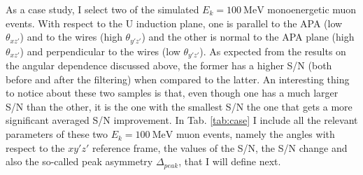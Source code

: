 As a case study, I select two of the simulated $E_{k} = 100 \ \mathrm{MeV}$ monoenergetic muon events. With respect to the U induction plane, one is parallel to the APA (low $\theta_{xz'}$) and to the wires (high $\theta_{y'z'}$) and the other is normal to the APA plane (high $\theta_{xz'}$) and perpendicular to the wires (low $\theta_{y'z'}$). As expected from the results on the angular dependence discussed above, the former has a higher S/N (both before and after the filtering) when compared to the latter. An interesting thing to notice about these two samples is that, even though one has a much larger S/N than the other, it is the one with the smallest S/N the one that gets a more significant averaged S/N improvement. In Tab. \ref{tab:case} I include all the relevant parameters of these two $E_{k} = 100 \ \mathrm{MeV}$ muon events, namely the angles with respect to the $xy'z'$ reference frame, the values of the S/N, the S/N change and also the so-called peak asymmetry $\Delta_{peak}$, that I will define next.


